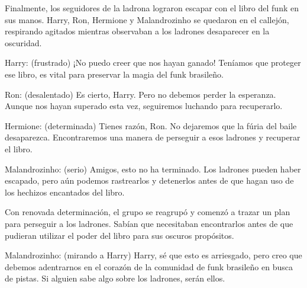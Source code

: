 Finalmente, los seguidores de la ladrona lograron escapar con el libro del funk en sus manos. Harry, Ron, Hermione y Malandrozinho se quedaron en el callejón, respirando agitados mientras observaban a los ladrones desaparecer en la oscuridad.

Harry: (frustrado) ¡No puedo creer que nos hayan ganado! Teníamos que proteger ese libro, es vital para preservar la magia del funk brasileño.


Ron: (desalentado) Es cierto, Harry. Pero no debemos perder la esperanza. Aunque nos hayan superado esta vez, seguiremos luchando para recuperarlo.


Hermione: (determinada) Tienes razón, Ron. No dejaremos que la fúria del baile desaparezca. Encontraremos una manera de perseguir a esos ladrones y recuperar el libro.


Malandrozinho: (serio) Amigos, esto no ha terminado. Los ladrones pueden haber escapado, pero aún podemos rastrearlos y detenerlos antes de que hagan uso de los hechizos encantados del libro.


Con renovada determinación, el grupo se reagrupó y comenzó a trazar un plan para perseguir a los ladrones. Sabían que necesitaban encontrarlos antes de que pudieran utilizar el poder del libro para sus oscuros propósitos.


Malandrozinho: (mirando a Harry) Harry, sé que esto es arriesgado, pero creo que debemos adentrarnos en el corazón de la comunidad de funk brasileño en busca de pistas. Si alguien sabe algo sobre los ladrones, serán ellos.